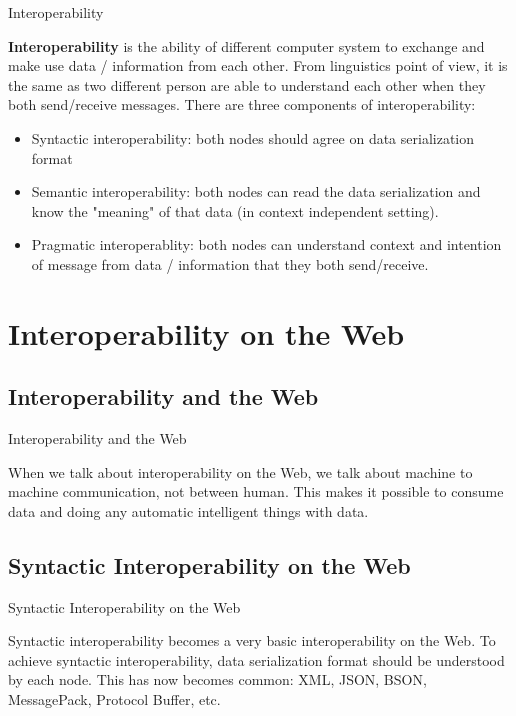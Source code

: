\documentclass[10pt]{beamer}
\begin{document}
    \begin{frame}[fragile]{Interoperability}

      \textbf{Interoperability} is the ability of different computer system to exchange and make use data / information from each other. From linguistics point of view, it is the same as two different person are able to understand each other when they both send/receive messages. There are three components of interoperability:
      \begin{itemize}
        \item Syntactic interoperability: both nodes should agree on data serialization format
        \item Semantic interoperability: both nodes can read the data serialization and know the "meaning" of that data (in context independent setting).
        \item Pragmatic interoperablity: both nodes can understand context and intention of message from data / information that they both send/receive.
      \end{itemize}

    \end{frame}

\section{Interoperability on the Web}

  \subsection{Interoperability and the Web}

    \begin{frame}[fragile]{Interoperability and the Web}

      When we talk about interoperability on the Web, we talk about machine to machine communication, not between human. This makes it possible to consume data and doing any automatic intelligent things with data.

    \end{frame}

  \subsection{Syntactic Interoperability on the Web}

    \begin{frame}[fragile]{Syntactic Interoperability on the Web}

      Syntactic interoperability becomes a very basic interoperability on the Web. To achieve syntactic interoperability, data serialization format should be understood by each node. This has now becomes common: XML, JSON, BSON, MessagePack, Protocol Buffer, etc.

    \end{frame}
\end{document}
